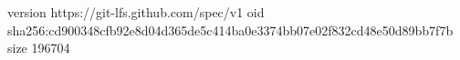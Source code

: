 version https://git-lfs.github.com/spec/v1
oid sha256:cd900348cfb92e8d04d365de5c414ba0e3374bb07e02f832cd48e50d89bb7f7b
size 196704
